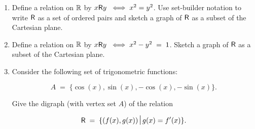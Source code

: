 \documentclass{amsart}
\begin{document}
\begin{enumerate}
\item Define a relation on ${\mathbb R}$ by $x \mbox{\textsf R} y \; \iff x^2 = y^2$.   Use set-builder notation to write $\mbox{\textsf R}$ as a set of ordered pairs and sketch a graph of $\mbox{\textsf R}$ as a subset of the Cartesian plane.

\vfill


\item Define a relation on ${\mathbb R}$ by $x \mbox{\textsf R} y \; \iff x^2 - y^2 \; = \; 1$. Sketch a graph of $\mbox{\textsf R}$ as a subset of the Cartesian plane.

\vfill

\newpage

\item Consider the following set of trigonometric functions:

\[ A \; = \; \{ \cos{(x)}, \sin{(x)}, -\cos{(x)}, -\sin{(x)} \}. \]

Give the digraph (with vertex set $A$) of the relation 

\[ \relR \; = \; \{ (f(x),g(x) ) \suchthat g(x) = f'(x) \}. \]

\vfill

\end{enumerate}
\end{document}
